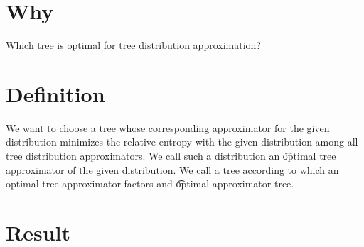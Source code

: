 

\section*{Why}

Which tree is optimal for tree distribution approximation?

\section*{Definition}

We want to choose a tree whose corresponding approximator for the given distribution minimizes the relative entropy with the given distribution among all tree distribution approximators.
We call such a distribution an \t{optimal} tree approximator of the given distribution.
We call a tree according to which an optimal tree approximator factors and \t{optimal} approximator tree.

\section*{Result}

